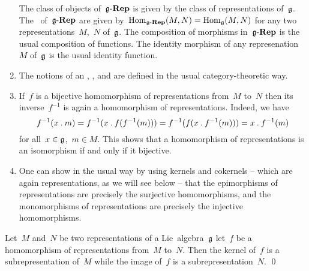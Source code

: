 \begin{remark}
\begin{enumerate}
      The class of objects of~$\mathfrak{g}\text{-}\mathbf{Rep}$ is given by the class of representations of~$\mathfrak{g}$.
      The~\spaces{$\Hom$} of~$\mathfrak{g}\text{-}\mathbf{Rep}$ are given by~$\operatorname{Hom}_{\mathfrak{g}\text{-}\mathbf{Rep}}(M, N) = \operatorname{Hom}_{\mathfrak{g}}(M,N)$ for any two representations~$M$,~$N$ of~$\mathfrak{g}$.
      The composition of morphisms in~$\mathfrak{g}\text{-}\mathbf{Rep}$ is the usual composition of functions.
      The identity morphism of any represenation~$M$ of~$\mathfrak{g}$ is the usual identity function.
    \item
      The notions of an  , ,  and  are defined in the usual category-theoretic way.
    \item
      If~$f$ is a bijective homomorphism of representations from~$M$ to~$N$ then its inverse~$f^{-1}$ is again a homomorphism of representations.
      Indeed, we have
      \[
        f^{-1}(x \mathbin{.} m)
        =
        f^{-1}(x \mathbin{.} f(f^{-1}(m)))
        =
        f^{-1}(f(x \mathbin{.} f^{-1}(m)))
        =
        x \mathbin{.} f^{-1}(m)
      \]
      for all~$x \in \mathfrak{g}$,~$m \in M$. 
      This shows that a homomorphism of representations is an isomorphism if and only if it bijective.
    \item
      One can show in the usual way by using kernels and cokernels -- which are again representations, as we will see below -- that the epimorphisms of representations are precisely the surjective homomorphisms, and the monomorphisms of representations are precisely the injective homomorphisms.
  \end{enumerate}
\end{remark}


\begin{lemma}
  Let~$M$ and~$N$ be two representations of a Lie~algebra~$\mathfrak{g}$ let~$f$ be a homomorphism of representations from~$M$ to~$N$.
  Then the kernel of~$f$ is a subrepresentation of~$M$ while the image of~$f$ is a subrepresentation~$N$.
  \qed
\end{lemma}


